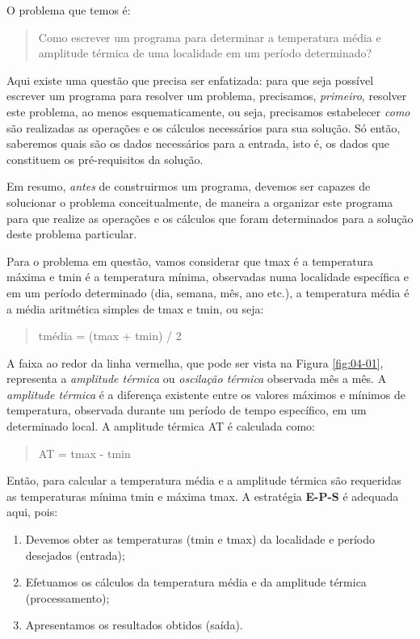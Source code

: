 \documentclass[
]{book}
\providecommand{\tightlist}{%
  \setlength{\itemsep}{0pt}\setlength{\parskip}{0pt}}
\begin{document}
O problema que temos é:

\begin{quote}
Como escrever um programa para determinar a temperatura média e amplitude térmica de uma localidade em um período determinado?
\end{quote}

Aqui existe uma questão que precisa ser enfatizada: para que seja possível escrever um programa para resolver um problema, precisamos, \emph{primeiro}, resolver este problema, ao menos esquematicamente, ou seja, precisamos estabelecer \emph{como} são realizadas as operações e os cálculos necessários para sua solução. Só então, saberemos quais são os dados necessários para a entrada, isto é, os dados que constituem os pré-requisitos da solução.

Em resumo, \emph{antes} de construirmos um programa, devemos ser capazes de solucionar o problema conceitualmente, de maneira a organizar este programa para que realize as operações e os cálculos que foram determinados para a solução deste problema particular.

Para o problema em questão, vamos considerar que tmax é a temperatura máxima e tmin é a temperatura mínima, observadas numa localidade específica e em um período determinado (dia, semana, mês, ano etc.), a temperatura média é a média aritmética simples de tmax e tmin, ou seja:

\begin{quote}
tmédia = (tmax + tmin) / 2
\end{quote}

A faixa ao redor da linha vermelha, que pode ser vista na Figura \ref{fig:04-01}, representa a \emph{amplitude térmica} ou \emph{oscilação térmica} observada mês a mês. A \emph{amplitude térmica} é a diferença existente entre os valores máximos e mínimos de temperatura, observada durante um período de tempo específico, em um determinado local. A amplitude térmica AT é calculada como:

\begin{quote}
AT = tmax - tmin
\end{quote}

Então, para calcular a temperatura média e a amplitude térmica são requeridas as temperaturas mínima tmin e máxima tmax. A estratégia \textbf{E-P-S} é adequada aqui, pois:

\begin{enumerate}
\def\labelenumi{\arabic{enumi}.}
\tightlist
\item
  Devemos obter as temperaturas (tmin e tmax) da localidade e período desejados (entrada);
\item
  Efetuamos os cálculos da temperatura média e da amplitude térmica (processamento);
\item
  Apresentamos os resultados obtidos (saída).
\end{enumerate}
\end{document}
